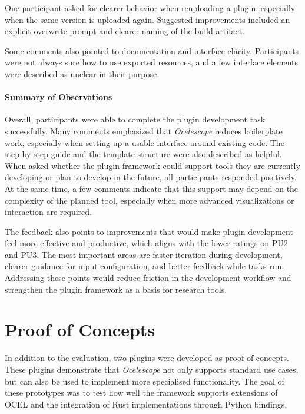 One participant asked for clearer behavior when reuploading a plugin, especially when the same version is uploaded again. Suggested improvements included an explicit overwrite prompt and clearer naming of the build artifact.

Some comments also pointed to documentation and interface clarity. Participants were not always sure how to use exported resources, and a few interface elements were described as unclear in their purpose.


\paragraph{Summary of Observations}

Overall, participants were able to complete the plugin development task successfully.
Many comments emphasized that \textit{Ocelescope} reduces boilerplate work, especially when setting up a usable interface around existing code.
The step-by-step guide and the template structure were also described as helpful.
When asked whether the plugin framework could support tools they are currently developing or plan to develop in the future, all participants responded positively.
At the same time, a few comments indicate that this support may depend on the complexity of the planned tool, especially when more advanced visualizations or interaction are required.

The feedback also points to improvements that would make plugin development feel more effective and productive, which aligns with the lower ratings on PU2 and PU3.
The most important areas are faster iteration during development, clearer guidance for input configuration, and better feedback while tasks run.
Addressing these points would reduce friction in the development workflow and strengthen the plugin framework as a basis for research tools.

\section{Proof of Concepts}

In addition to the evaluation, two plugins were developed as proof of concepts.
These plugins demonstrate that \textit{Ocelescope} not only supports standard use cases, but can also be used to implement more specialised functionality.
The goal of these prototypes was to test how well the framework supports extensions of OCEL and the integration of Rust implementations through Python bindings.

